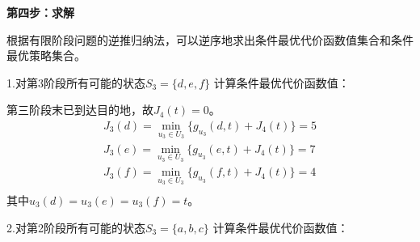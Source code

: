 \begin{example}
    \textbf{第四步：求解}

    根据有限阶段问题的逆推归纳法，可以逆序地求出条件最优代价函数值集合和条件最优策略集合。

    1.对第3阶段所有可能的状态$S_3 = \{d,e,f\}$ 计算条件最优代价函数值：

    第三阶段末已到达目的地，故$J_4(t) = 0$。
    \begin{equation}
        \begin{aligned}
            J_3(d) = \min_{u_3 \in U_3} \{g_{u_3}(d,t)+J_4(t)\} = 5 \\
            J_3(e) = \min_{u_3 \in U_3} \{g_{u_3}(e,t)+J_4(t)\} = 7 \\
            J_3(f) = \min_{u_3 \in U_3} \{g_{u_3}(f,t)+J_4(t)\} = 4 \\
        \end{aligned}
    \end{equation}
    其中$u_3(d) = u_3(e) = u_3(f) = t$。

    2.对第2阶段所有可能的状态$S_3 = \{a,b,c\}$ 计算条件最优代价函数值：


\end{example}
